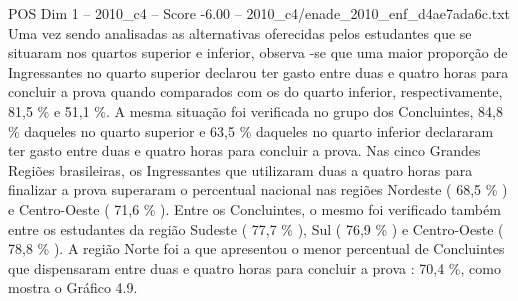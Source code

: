\begin{textsample}{POS Dim 1 – 2010\_c4 – Score -6.00 – 2010\_c4/enade\_2010\_enf\_d4ae7ada6c.txt}
Uma vez sendo analisadas as alternativas oferecidas pelos estudantes que se situaram nos quartos superior e inferior, observa -se que uma maior proporção de Ingressantes no quarto superior declarou ter gasto entre duas e quatro horas para concluir a prova quando comparados com os do quarto inferior, respectivamente, 81,5 \% e 51,1 \%.
A mesma situação foi verificada no grupo dos Concluintes, 84,8 \% daqueles no quarto superior e 63,5 \% daqueles no quarto inferior declararam ter gasto entre duas e quatro horas para concluir a prova.
Nas cinco Grandes Regiões brasileiras, os Ingressantes que utilizaram duas a quatro horas para finalizar a prova superaram o percentual nacional nas regiões Nordeste ( 68,5 \% ) e Centro-Oeste ( 71,6 \% ).
Entre os Concluintes, o mesmo foi verificado também entre os estudantes da região Sudeste ( 77,7 \% ), Sul ( 76,9 \% ) e Centro-Oeste ( 78,8 \% ).
A região Norte foi a que apresentou o menor percentual de Concluintes que dispensaram entre duas e quatro horas para concluir a prova : 70,4 \%, como mostra o Gráfico 4.9.

\end{textsample}

